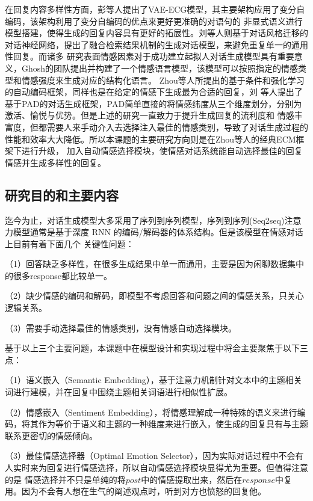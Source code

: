 \documentclass[supercite]{HustGraduPaper}
\theoremstyle{definition}
\begin{document}
在回复内容多样性方面，彭\cite{彭叶红2019基于主题模型与变分自编码的情感对话生成技术研究}等人提出了VAE-ECG模型，其主要架构应用了变分自编码，该架构利用了变分自编码的优点来更好更准确的对语句的
非显式语义进行模型搭建，使得生成的回复内容具有更好的拓展性。刘\cite{对话风格迁移}等人则基于对话风格迁移的对话神经网络，提出了融合检索结果机制的生成对话模型，来避免重复单一的通用性回复。而诸多
研究表面情感因素对于成功建立起拟人对话生成模型具有重要意义，Ghosh\cite{ghosh2017affect}的团队提出并构建了一个情感语言模型，该模型可以按照指定的情感类型和情感强度来生成对应的结构化语言。
Zhou等人\cite{DBLP:journals/corr/ZhouHZZL17}所提出的基于条件和强化学习的自动编码框架，同样也是在给定的情感下生成最为合适的回复，刘\cite{刘宁2019人机交互的情感拟人化策略研究}
等人提出了基于PAD的对话生成框架，PAD简单直接的将情感纬度从三个维度划分，分别为激活、愉悦与优势。但是上述的研究一直致力于提升生成回复的流利度和
情感丰富度，但都需要人来手动介入去选择注入最佳的情感类别，导致了对话生成过程的性能和效率大大降低。所以本课题的主要研究方向则是在Zhou\cite{DBLP:journals/corr/ZhouHZZL17}等人的经典ECM框架下进行升级，
加入自动情感选择模块，使情感对话系统能自动选择最佳的回复情感并生成多样性的回复。

\subsection{研究目的和主要内容}
迄今为止，对话生成模型大多采用了序列到序列模型，序列到序列(Seq2seq)注意力模型通常是基于深度 RNN 的编码/解码器的体系结构。但是该模型在情感对话上目前有着下面几个
关键性问题：

（1）回答缺乏多样性，在很多生成结果中单一而通用，主要是因为闲聊数据集中的很多response都比较单一。

（2）缺少情感的编码和解码，即模型不考虑回答和问题之间的情感关系，只关心逻辑关系。

（3）需要手动选择最佳的情感类别，没有情感自动选择模块。

基于以上三个主要问题，本课题中在模型设计和实现过程中将会主要聚焦于以下三点：

（1）语义嵌入（Semantic Embedding），基于注意力机制针对文本中的主题相关词进行建模，并在回复中围绕主题相关词语进行相似性扩展。

（2）情感嵌入（Sentiment Embedding），将情感理解成一种特殊的语义来进行编码，将其作为等价于语义和主题的一种维度来进行嵌入，使生成的回复具有与主题联系更密切的情感倾向。

（3）最佳情感选择器\cite{wei2019emotion}（Optimal Emotion Selector），因为实际对话过程中不会有人实时来为回复进行情感选择，所以自动情感选择模块显得尤为重要。但值得注意的是
情感选择并不只是单纯的将$post$中的情感提取出来，然后在$response$中复用。因为不会有人想在生气的阐述观点时，听到对方也愤怒的回复他。
\end{document}
